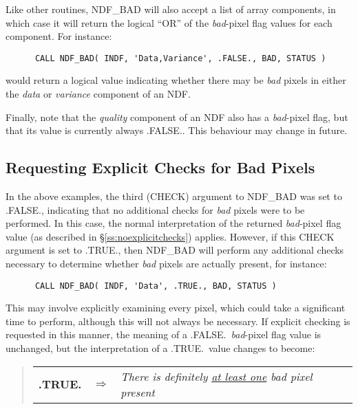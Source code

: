\documentclass[twoside,11pt]{article}
\newcommand{\htmlref}[2]{#1}
\newcommand{\xlabel}[1]{}
\newcommand{\st}[1]{{\em{#1}}}
\begin{document}
Like other routines, NDF\_BAD will also accept a list of array components,
in which case it will return the logical ``OR'' of the \st{bad\/}-pixel flag
values for each component. 
For instance:

\small
\begin{verbatim}
      CALL NDF_BAD( INDF, 'Data,Variance', .FALSE., BAD, STATUS )
\end{verbatim}
\normalsize

would return a logical value indicating whether there may be \st{bad\/}
pixels in either the \st{data\/} or \st{variance\/} component of an NDF. 

Finally, note that the \st{quality\/} component of an NDF also has a
\st{bad\/}-pixel flag, but that its value is currently always .FALSE..
This behaviour may change in future.

\subsection{\xlabel{requesting_explicit_checks_for_bad_pixels}\label{ss:badpixelabort}\label{ss:explicitchecks}Requesting Explicit Checks for Bad Pixels}

In the above examples, the third (CHECK) argument to \htmlref{NDF\_BAD}{NDF_BAD} was set to
.FALSE., indicating that no additional checks for \st{bad\/} pixels were to
be performed. 
In this case, the normal interpretation of the returned \st{bad\/}-pixel flag
value (as described in \S\ref{ss:noexplicitchecks}) applies. 
However, if this CHECK argument is set to .TRUE., then NDF\_BAD will perform
any additional checks necessary to determine whether \st{bad\/} pixels are
actually present, for instance:

\small
\begin{verbatim}
      CALL NDF_BAD( INDF, 'Data', .TRUE., BAD, STATUS )
\end{verbatim}
\normalsize

This may involve explicitly examining every pixel, which could take a
significant time to perform, although this will not always be necessary. 
If explicit checking is requested in this manner, the meaning of a
.FALSE.\ \st{bad\/}-pixel flag value is unchanged, but the
interpretation of a .TRUE.\ value changes to become: 

\small
\begin{quote}
\begin{center}
\begin{tabular}{rcl}
{\bf .TRUE.} & $\Rightarrow$ & \st{There is definitely \underline{at least one}
bad pixel present} 
\end{tabular}
\end{center}
\end{quote}
\normalsize
\end{document}
